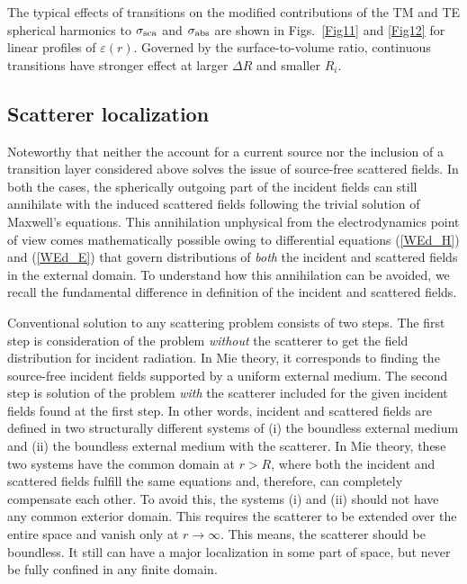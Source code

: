\documentclass[aps,prb,reprint]{revtex4-2}
\begin{document}
The typical effects of transitions on the modified contributions of the TM and TE spherical harmonics to $\sigma_{\rm sca}$ and $\sigma_{\rm abs}$ are shown in Figs.~\ref{Fig11} and \ref{Fig12} for linear profiles of $\varepsilon(r)$. Governed by the surface-to-volume ratio, continuous transitions have stronger effect at larger $\Delta R$ and smaller $R_i$. 

\subsection{Scatterer localization}

Noteworthy that neither the account for a current source nor the inclusion of a transition layer considered above solves the issue of source-free scattered fields. In both the cases, the spherically outgoing part of the incident fields can still annihilate with the induced scattered fields following the trivial solution of Maxwell's equations. This annihilation unphysical from the electrodynamics point of view comes mathematically possible owing to differential equations (\ref{WEd_H}) and (\ref{WEd_E}) that govern distributions of {\it both} the incident and scattered fields in the external domain. To understand how this annihilation can be avoided, we recall the fundamental difference in definition of the incident and scattered fields. 

Conventional solution to any scattering problem consists of two steps. 
The first step is consideration of the problem {\it without} the scatterer to get the field distribution for incident radiation. 
In Mie theory, it corresponds to finding the source-free incident fields supported by a uniform external medium. 
The second step is solution of the problem {\it with} the scatterer included for the given incident fields found at the first step. 
In other words, incident and scattered fields are defined in two structurally different systems of (i) the boundless external medium and (ii) the boundless external medium with the scatterer. 
In Mie theory, these two systems have the common domain at $r>R$, where both the incident and scattered fields fulfill the same equations and, therefore, can completely compensate each other. 
To avoid this, the systems (i) and (ii) should not have any common exterior domain. 
This requires the scatterer to be extended over the entire space and vanish only at $r\rightarrow \infty$. 
This means, the scatterer should be boundless. It still can have a major localization in some part of space, but never be fully confined in any finite domain.  
\end{document}
